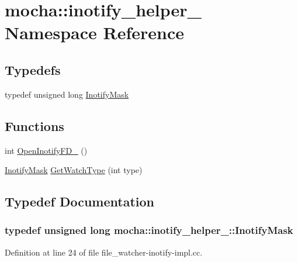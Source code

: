 \hypertarget{namespacemocha_1_1inotify__helper__}{
\section{mocha::inotify\_\-helper\_\- Namespace Reference}
\label{namespacemocha_1_1inotify__helper__}
}
\subsection*{Typedefs}
\begin{DoxyCompactItemize}
\item 
typedef unsigned long \hyperlink{namespacemocha_1_1inotify__helper___aa8d25eea9099a062f693484523e0d508}{InotifyMask}
\end{DoxyCompactItemize}
\subsection*{Functions}
\begin{DoxyCompactItemize}
\item 
int \hyperlink{namespacemocha_1_1inotify__helper___a7c9694e0500321b1856f15e64556a1d4}{OpenInotifyFD\_\-} ()
\item 
\hyperlink{namespacemocha_1_1inotify__helper___aa8d25eea9099a062f693484523e0d508}{InotifyMask} \hyperlink{namespacemocha_1_1inotify__helper___ac978057f9a7394984b74291ccd2e575f}{GetWatchType} (int type)
\end{DoxyCompactItemize}


\subsection{Typedef Documentation}
\hypertarget{namespacemocha_1_1inotify__helper___aa8d25eea9099a062f693484523e0d508}{
\subsubsection[{InotifyMask}]{\setlength{\rightskip}{0pt plus 5cm}typedef unsigned long {\bf mocha::inotify\_\-helper\_\-::InotifyMask}}}
\label{namespacemocha_1_1inotify__helper___aa8d25eea9099a062f693484523e0d508}


Definition at line 24 of file file\_\-watcher-\/inotify-\/impl.cc.



